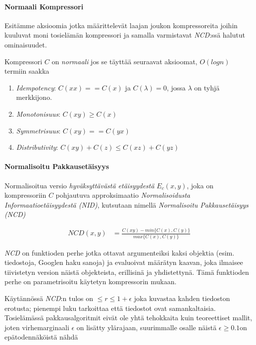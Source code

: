 \documentclass[11pt,finnish]{tktltiki2}
\theoremstyle{definition}
\theoremstyle{remark}
\begin{document}
\paragraph{Normaali Kompressori} %
\label{par:normaali_kompressori}

  Esitämme aksioomia jotka määrittelevät laajan joukon kompressoreita joihin kuuluvat moni tosielämän kompressori ja samalla varmistavat  \emph{NCD}:ssä halutut ominaisuudet.

  Kompressori $C$ on \emph{normaali} jos se täyttää seuraavat aksioomat, $O(log n)$ termiin saakka

  \begin{enumerate}
    \item \emph{Idempotency}: $C(xx) == C(x)$ ja $C(\lambda) = 0$, jossa $\lambda$ on tyhjä merkkijono.
    \item \emph{Monotonisuus}: $C(xy) \geq C(x)$
    \item \emph{Symmetrisuus}: $C(xy) == C(yx)$
    \item \emph{Distributivity}: $C(xy) + C(z) \leq C(xz) + C(yz)$
  \end{enumerate}


\paragraph{Normalisoitu Pakkausetäisyys} %
\label{par:normalisoitu_pakkauset_isyys}

  Normalisoitua versio \emph{hyväksyttävästä etäisyydestä} $E_c(x,y)$, joka on kompressoriin $C$ pohjautuva approksimaatio \emph{Normalisoidusta Informaatioetäisyydestä (NID)}, kutsutaan nimellä \emph{Normalisoitu Pakkausetäisyys (NCD)} \cite{CV05}

  \begin{align*}
    NCD(x,y) &= \frac{C(xy)-min\{C(x),C(y)\}}{max\{C(x),C(y)\}}
  \end{align*}

  \emph{NCD} on funktioden perhe jotka ottavat argumenteiksi kaksi objektia (esim. tiedostoja, Googlen haku sanoja) ja evaluoivat määrätyn kaavan, joka ilmaisee tiivistetyn version näistä objekteista, erillisinä ja yhdistettynä. Tämä funktioden perhe on parametrisoitu käytetyn kompressorin mukaan.

  Käytännössä \emph{NCD}:n tulos on $ \leq r \leq 1+ \epsilon$ joka kuvastaa kahden tiedoston erotusta; pienempi luku tarkoittaa että tiedostot ovat samankaltaisia. Tosielämässä pakkausalgoritmit eivät ole yhtä tehokkaita kuin teoreettiset mallit, joten virhemarginaali $\epsilon$ on lisätty ylärajaan, suurimmalle osalle näistä  $\epsilon \geq 0.1$on epätodennäköistä nähdä
\end{document}
